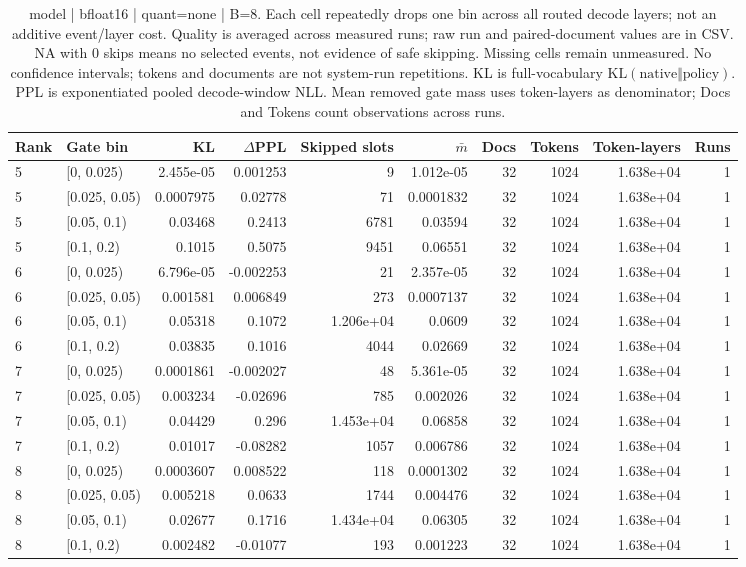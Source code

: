 \begin{table}[t]
\centering
\footnotesize
\begin{tabular}{llrrrrrrrr}
\hline
Rank & Gate bin & KL & $\Delta$PPL & Skipped slots & $\bar m$ & Docs & Tokens & Token-layers & Runs \\
\hline
5 & [0, 0.025) & 2.455e-05 & 0.001253 & 9 & 1.012e-05 & 32 & 1024 & 1.638e+04 & 1 \\
5 & [0.025, 0.05) & 0.0007975 & 0.02778 & 71 & 0.0001832 & 32 & 1024 & 1.638e+04 & 1 \\
5 & [0.05, 0.1) & 0.03468 & 0.2413 & 6781 & 0.03594 & 32 & 1024 & 1.638e+04 & 1 \\
5 & [0.1, 0.2) & 0.1015 & 0.5075 & 9451 & 0.06551 & 32 & 1024 & 1.638e+04 & 1 \\
6 & [0, 0.025) & 6.796e-05 & -0.002253 & 21 & 2.357e-05 & 32 & 1024 & 1.638e+04 & 1 \\
6 & [0.025, 0.05) & 0.001581 & 0.006849 & 273 & 0.0007137 & 32 & 1024 & 1.638e+04 & 1 \\
6 & [0.05, 0.1) & 0.05318 & 0.1072 & 1.206e+04 & 0.0609 & 32 & 1024 & 1.638e+04 & 1 \\
6 & [0.1, 0.2) & 0.03835 & 0.1016 & 4044 & 0.02669 & 32 & 1024 & 1.638e+04 & 1 \\
7 & [0, 0.025) & 0.0001861 & -0.002027 & 48 & 5.361e-05 & 32 & 1024 & 1.638e+04 & 1 \\
7 & [0.025, 0.05) & 0.003234 & -0.02696 & 785 & 0.002026 & 32 & 1024 & 1.638e+04 & 1 \\
7 & [0.05, 0.1) & 0.04429 & 0.296 & 1.453e+04 & 0.06858 & 32 & 1024 & 1.638e+04 & 1 \\
7 & [0.1, 0.2) & 0.01017 & -0.08282 & 1057 & 0.006786 & 32 & 1024 & 1.638e+04 & 1 \\
8 & [0, 0.025) & 0.0003607 & 0.008522 & 118 & 0.0001302 & 32 & 1024 & 1.638e+04 & 1 \\
8 & [0.025, 0.05) & 0.005218 & 0.0633 & 1744 & 0.004476 & 32 & 1024 & 1.638e+04 & 1 \\
8 & [0.05, 0.1) & 0.02677 & 0.1716 & 1.434e+04 & 0.06305 & 32 & 1024 & 1.638e+04 & 1 \\
8 & [0.1, 0.2) & 0.002482 & -0.01077 & 193 & 0.001223 & 32 & 1024 & 1.638e+04 & 1 \\
\hline
\end{tabular}
\caption{model | bfloat16 | quant=none | B=8. Each cell repeatedly drops one bin across all routed decode layers; not an additive event/layer cost. Quality is averaged across measured runs; raw run and paired-document values are in CSV. NA with 0 skips means no selected events, not evidence of safe skipping. Missing cells remain unmeasured. No confidence intervals; tokens and documents are not system-run repetitions. KL is full-vocabulary $\mathrm{KL}(\mathrm{native}\Vert\mathrm{policy})$. PPL is exponentiated pooled decode-window NLL. Mean removed gate mass uses token-layers as denominator; Docs and Tokens count observations across runs.}
\label{tab:T1_model_bfloat16_quant_none_B_8_2471c874}
\end{table}
